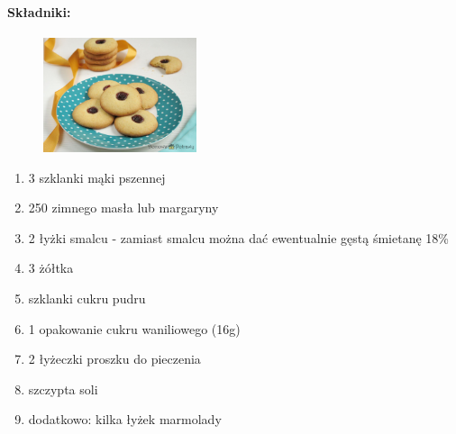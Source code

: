 \documentclass{article}
\begin{document}
    \paragraph{Składniki:}
    \begin{figure}
        \includegraphics[width=0.4\textwidth]{kruche_ciasteczka_marmolada.jpg}
    \end{figure}
    \begin{enumerate}
        \item 3 szklanki mąki pszennej
        \item 250 zimnego masła lub margaryny
        \item 2 łyżki smalcu - zamiast smalcu można dać ewentualnie gęstą
            śmietanę 18\%
        \item 3 żółtka
        \item {} szklanki cukru pudru
        \item 1 opakowanie cukru waniliowego (16g)
        \item 2 łyżeczki proszku do pieczenia
        \item szczypta soli
        \item dodatkowo: kilka łyżek marmolady
    \end{enumerate}
\end{document}
